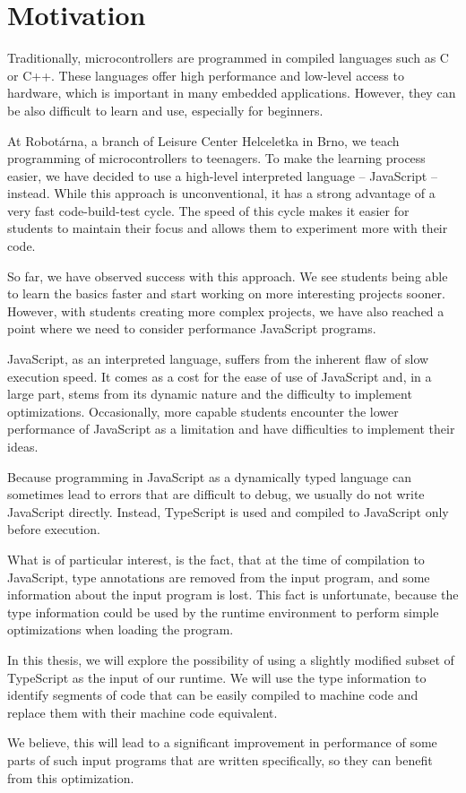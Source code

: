 \chapter{Motivation}

Traditionally, microcontrollers are programmed in compiled languages such as C or C++. These languages offer high performance and low-level access to hardware, which is important in many embedded applications. However, they can be also difficult to learn and use, especially for beginners.

At Robotárna, a branch of Leisure Center Helceletka in Brno, we teach programming of microcontrollers to teenagers. To make the learning process easier, we have decided to use a high-level interpreted language -- JavaScript -- instead. While this approach is unconventional, it has a strong advantage of a very fast code-build-test cycle. The speed of this cycle makes it easier for students to maintain their focus and allows them to experiment more with their code.

So far, we have observed success with this approach. We see students being able to learn the basics faster and start working on more interesting projects sooner. However, with students creating more complex projects, we have also reached a point where we need to consider performance JavaScript programs.

JavaScript, as an interpreted language, suffers from the inherent flaw of slow execution speed. It comes as a cost for the ease of use of JavaScript and, in a large part, stems from its dynamic nature and the difficulty to implement optimizations. Occasionally, more capable students encounter the lower performance of JavaScript as a limitation and have difficulties to implement their ideas.

Because programming in JavaScript as a dynamically typed language can sometimes lead to errors that are difficult to debug, we usually do not write JavaScript directly. Instead, TypeScript is used and compiled to JavaScript only before execution.

What is of particular interest, is the fact, that at the time of compilation to JavaScript, type annotations are removed from the input program, and some information about the input program is lost. This fact is unfortunate, because the type information could be used by the runtime environment to perform simple optimizations when loading the program.

In this thesis, we will explore the possibility of using a slightly modified subset of TypeScript as the input of our runtime. We will use the type information to identify segments of code that can be easily compiled to machine code and replace them with their machine code equivalent.

We believe, this will lead to a significant improvement in performance of some parts of such input programs that are written specifically, so they can benefit from this optimization.
